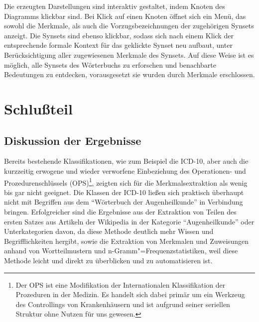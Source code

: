 \documentclass[pagesize,paper=A4,DIV=calc,fontsize=12pt,draft=false]{scrreprt}
\begin{document}
Die erzeugten Darstellungen sind interaktiv gestaltet, indem Knoten des Diagramms klickbar sind. 
Bei Klick auf einen Knoten öffnet sich ein Menü, das sowohl die Merkmale, als auch die Vorzugsbezeichnungen der zugehörigen Synsets anzeigt. 
Die Synsets sind ebenso klickbar, sodass sich nach einem Klick der entsprechende formale Kontext für das geklickte Synset neu aufbaut, unter Berücksichtigung aller zugewiesenen Merkmale des Synsets. 
Auf diese Weise ist es möglich, alle Synsets des Wörterbuchs zu erforschen und benachbarte Bedeutungen zu entdecken, vorausgesetzt sie wurden durch Merkmale erschlossen. 

\chapter{Schlußteil}

\section{Diskussion der Ergebnisse}

Bereits bestehende Klassifikationen, wie zum Beispiel die ICD-10, aber auch die kurzzeitig erwogene und wieder verworfene Einbeziehung des Operationen- und Prozedurenschlüssels (OPS)\footnote{Der OPS ist eine Modifikation der Internationalen Klassifikation der Prozeduren in der Medizin. Es handelt sich dabei primär um ein Werkzeug des Controllings von Krankenhäusern und ist aufgrund seiner seriellen Struktur ohne Nutzen für uns gewesen.}, zeigten sich für die Merkmalsextraktion als wenig bis gar nicht geeignet. 
Die Klassen der ICD-10 ließen sich praktisch überhaupt nicht mit Begriffen aus dem \enquote{Wörterbuch der Augenheilkunde} in Verbindung bringen. 
Erfolgreicher sind die Ergebnisse aus der Extraktion von Teilen des ersten Satzes aus Artikeln der Wikipedia in der Kategorie \enquote{Augenheilkunde} oder Unterkategorien davon, da diese Methode deutlich mehr Wissen und Begrifflichkeiten hergibt, sowie die Extraktion von Merkmalen und Zuweisungen anhand von Wortteilmustern und n-Gramm"=Frequenzstatistiken, weil diese Methode leicht und direkt zu überblicken und zu automatisieren ist. 
\end{document}

